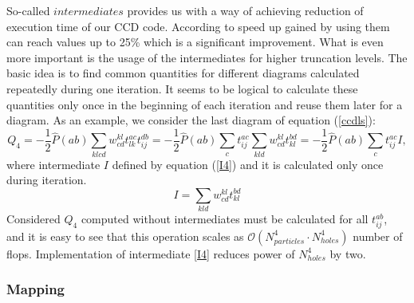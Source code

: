 \documentclass[twoside,english]{uiofysmaster}
\begin{document}
So-called $intermediates$ provides us with a way of achieving
reduction of execution time of our CCD code.  According to
\cite{MillerQuantumMechanicalStudies2017} speed up gained by using
them can reach values up to 25\% which is a significant
improvement. What is even more important is the usage of the
intermediates for higher truncation levels.  The basic idea is to find
common quantities for different diagrams calculated repeatedly during
one iteration. It seems to be logical to calculate these quantities
only once in the beginning of each iteration and reuse them later for
a diagram. As an example, we consider the last diagram of equation
(\ref{ccdls}):
\begin{equation}
Q_4 = -\frac{1}{2}\hat{P}(ab)\sum_{klcd}w_{cd}^{kl}t_{lk}^{ac}t_{ij}^{db} = -\frac{1}{2}\hat{P}(ab) \sum_{c} t_{ij}^{ac} \sum_{kld} w_{cd}^{kl} t_{kl}^{bd} = -\frac{1}{2}\hat{P}(ab) \sum_{c} t_{ij}^{ac} I,
\end{equation}
where intermediate $I$ defined by equation (\ref{I4}) and it is calculated only once during iteration.
\begin{equation}\label{I4}
I = \sum_{kld} w_{cd}^{kl} t_{kl}^{bd}
\end{equation}
Considered $Q_4$ computed without intermediates must be calculated for all $t_{ij}^{ab}$, and it is easy to see that this operation scales as $\mathcal{O} (N_{particles}^4\cdot N_{holes}^4)$ number of flops. Implementation of intermediate \ref{I4} reduces power of $N_{holes}^4$ by two.

\subsubsection{Mapping}
\end{document}
